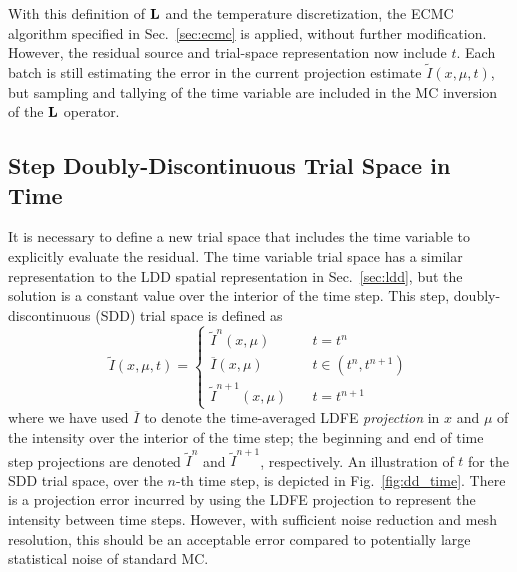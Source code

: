 With this definition of $\mathbf{L}$ and the temperature discretization, the ECMC algorithm specified in
Sec.~\ref{sec:ecmc} is applied, without further modification.  However, the residual
source and trial-space representation now include $t$.   Each batch is still estimating the error in the
current projection estimate $\tilde I(x,\mu,t)$, but sampling and tallying of the time
variable are included in the MC inversion of the $\mathbf{L}$
operator.  

\subsection{Step Doubly-Discontinuous Trial Space in Time}

It is necessary to define a new trial space that includes the time variable to explicitly evaluate the residual.
The time variable trial space has a similar representation to the LDD spatial representation 
in Sec.~\ref{sec:ldd}, but the solution is a constant value over
the interior of the time step. This step, doubly-discontinuous (SDD) trial space is defined as
\begin{equation}\label{eq:time_space}
    \tilde I(x,\mu,t) = \left \{ \begin{array}{cl}
        \tilde I^{n}(x,\mu)  & \quad t = t^n \\ 
        \overline I(x,\mu)  & \quad t \in (t^{n},t^{n+1}) \\               
      \tilde I^{n+1}(x,\mu)   &  \quad        t = t^{n+1}
    \end{array}           \right.
\end{equation}
where we have used $\overline I$ to denote the time-averaged LDFE \emph{projection} in $x$
and $\mu$ of the intensity over the interior of the time step;  the beginning and end of
time step projections are denoted $\tilde I^{n}$ and $\tilde I^{n+1}$, respectively.   An
illustration of $t$ for the SDD trial space, over the $n$-th time step, 
is depicted in Fig.~\ref{fig:dd_time}.    There is a projection error incurred by using the LDFE
projection to represent the intensity between time steps.  However, with sufficient noise
reduction and mesh resolution, this should be an acceptable error compared to potentially large
statistical noise of standard MC.
